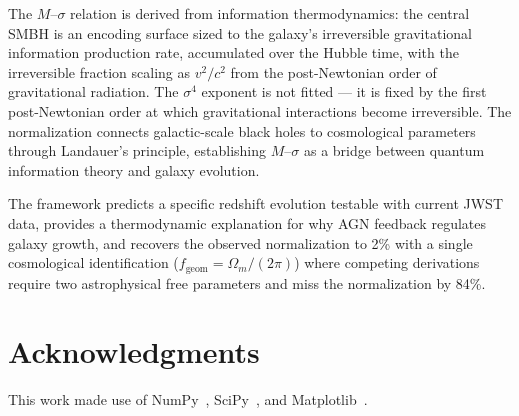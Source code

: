 \documentclass[12pt,a4paper]{article}
\begin{document}
The $M$--$\sigma$ relation is derived from information thermodynamics: the central
SMBH is an encoding surface sized to the galaxy's irreversible gravitational
information production rate, accumulated over the Hubble time, with the irreversible
fraction scaling as $v^2/c^2$ from the post-Newtonian order of gravitational
radiation. The $\sigma^4$ exponent is not fitted --- it is fixed by the first
post-Newtonian order at which gravitational interactions become irreversible. The
normalization connects galactic-scale black holes to cosmological parameters through
Landauer's principle, establishing $M$--$\sigma$ as a bridge between quantum
information theory and galaxy evolution.

The framework predicts a specific redshift evolution testable with current JWST
data, provides a thermodynamic explanation for why AGN feedback regulates galaxy
growth, and recovers the observed normalization to 2\% with a single cosmological
identification ($f_\mathrm{geom} = \Omega_m/(2\pi)$) where competing derivations
require two astrophysical free parameters and miss the normalization by 84\%.

\section*{Acknowledgments}

This work made use of NumPy~\citep{Harris2020}, SciPy~\citep{Virtanen2020}, and
Matplotlib~\citep{Hunter2007}.
\end{document}
